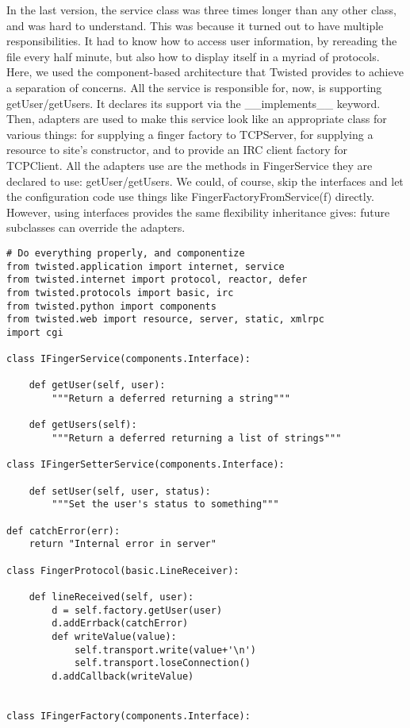 In the last version, the service class was three times longer than any other class, and was hard to understand. This was because it turned out to have multiple responsibilities. It had to know how to access user information, by rereading the file every half minute, but also how to display itself in a myriad of protocols. Here, we used the component-based architecture that Twisted provides to achieve a separation of concerns. All the service is responsible for, now, is supporting getUser/getUsers. It declares its support via the \_\_implements\_\_ keyword. Then, adapters are used to make this service look like an appropriate class for various things: for supplying a finger factory to TCPServer, for supplying a resource to site's constructor, and to provide an IRC client factory for TCPClient. All the adapters use are the methods in FingerService they are declared to use: getUser/getUsers. We could, of course, skip the interfaces and let the configuration code use things like FingerFactoryFromService(f) directly. However, using interfaces provides the same flexibility inheritance gives: future subclasses can override the adapters.\begin{verbatim}
# Do everything properly, and componentize
from twisted.application import internet, service
from twisted.internet import protocol, reactor, defer
from twisted.protocols import basic, irc
from twisted.python import components
from twisted.web import resource, server, static, xmlrpc
import cgi

class IFingerService(components.Interface):

    def getUser(self, user):
        """Return a deferred returning a string"""

    def getUsers(self):
        """Return a deferred returning a list of strings"""

class IFingerSetterService(components.Interface):

    def setUser(self, user, status):
        """Set the user's status to something"""

def catchError(err):
    return "Internal error in server"

class FingerProtocol(basic.LineReceiver):

    def lineReceived(self, user):
        d = self.factory.getUser(user)
        d.addErrback(catchError)
        def writeValue(value):
            self.transport.write(value+'\n')
            self.transport.loseConnection()
        d.addCallback(writeValue)


class IFingerFactory(components.Interface):


\end{verbatim}
